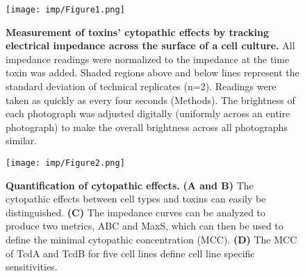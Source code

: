 \begin{figure}[h!]
  \centering
  \texttt{[image: imp/Figure1.png]}
  \caption[Measurement of toxins' cytopathic effects by tracking 
            electrical impedance across the surface of a cell culture]{
       \textbf{Measurement of toxins' cytopathic effects by tracking electrical 
             impedance across the surface of a cell culture.}
       All impedance readings were normalized to the impedance at 
       the time toxin was added. Shaded regions above and below lines 
       represent the standard deviation of technical replicates (n=2). 
       Readings were taken as quickly as every four seconds (Methods). 
       The brightness of each photograph was adjusted digitally 
       (uniformly across an entire photograph) to make the overall 
       brightness across all photographs similar.
  }
  \label{imp:fig1}
\end{figure}

\begin{figure}[h!]
  \centering
  \texttt{[image: imp/Figure2.png]}
  \caption[SQuantification of cytopathic effects]{
       \textbf{Quantification of cytopathic effects. }
       \textbf{(A and B)} The cytopathic effects between cell types and 
       toxins can easily be distinguished. \textbf{(C)} The impedance 
       curves can be analyzed to produce two metrics, ABC and 
       MaxS, which can then be used to define the minimal 
       cytopathic concentration (MCC). \textbf{(D)} The MCC of TcdA and 
       TcdB for five cell lines define cell line specific sensitivities.
  }
  \label{imp:fig2}
\end{figure}

